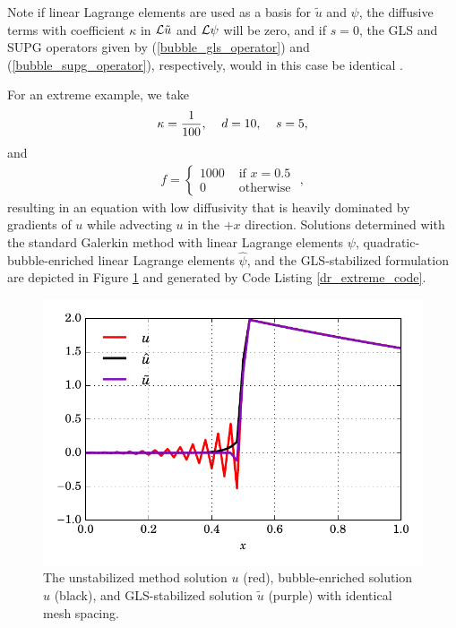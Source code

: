 Note if linear Lagrange elements are used as a basis for $\tilde{u}$ and $\psi$, the diffusive terms with coefficient $\kappa$ in $\mathcal{L} \tilde{u}$ and $\mathcal{L} \psi$ will be zero, and if $s = 0$, the GLS and SUPG operators given by (\ref{bubble_gls_operator}) and (\ref{bubble_supg_operator}), respectively, would in this case be identical \citep{hughes_1989}.

For an extreme example, we take
\begin{align*}
  \kappa = \frac{1}{100}, \hspace{4mm} d = 10, \hspace{4mm} s = 5,
\end{align*}
and
\begin{align*}
  f = \begin{cases}
        1000 & \text{ if } x = 0.5 \\
        0 & \text{ otherwise }
      \end{cases},
\end{align*}
resulting in an equation with low diffusivity that is heavily dominated by gradients of $u$ while advecting $u$ in the $+x$ direction.  Solutions determined with the standard Galerkin method with linear Lagrange elements $\psi$, quadratic-bubble-enriched linear Lagrange elements $\hat{\psi}$, and the GLS-stabilized formulation are depicted in Figure \ref{dr_extreme_image} and generated by Code Listing \ref{dr_extreme_code}.


\begin{figure}
  \centering
    \includegraphics[width=\linewidth]{images/bubbles/extreme_new.pdf}
  \caption[Advection-diffusion-reaction stabilization example]{The unstabilized method solution $u$ (red), bubble-enriched solution $\hat{u}$ (black), and GLS-stabilized solution $\tilde{u}$ (purple) with identical mesh spacing.}
  \label{dr_extreme_image}
\end{figure}


